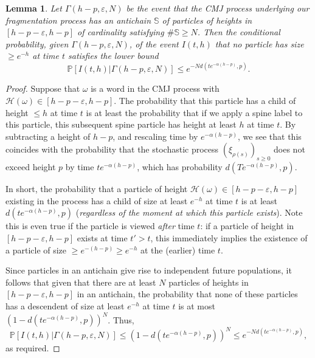 \documentclass[a4,12pt]{amsart}
\numberwithin{equation}{section}
\newtheorem{lemma}[thm]{Lemma}
\begin{document}
    \begin{lemma} \label{lem:previous}
    Let $\Gamma(h-p,\varepsilon,N)$ be the event that the CMJ process underlying our fragmentation process has an antichain $\mathbb{S}$ of particles of heights in $[h-p-\varepsilon,h-p]$ of cardinality satisfying $\# \mathbb{S} \geq N$.     Then the conditional probability, given $\Gamma(h-p,\varepsilon,N)$, of the event $I(t,h)$ that no particle has size $\geq e^{-h}$ at time $t$ satisfies the lower bound
\begin{equation}
\mathbb{P}[ I(t,h) | \Gamma(h-p,\varepsilon,N) ] \leq e^{ - N d(te^{-\alpha(h-p)},p)  }.
\end{equation}
    \end{lemma}

\begin{proof}
Suppose that $\omega$ is a word in the CMJ process with $\mathcal{H}(\omega) \in [h-p-\varepsilon,h-p]$. The probability that this particle has a child of height $\leq h$ at time $t$ is at least the probability that if we apply a spine label to this particle, this subsequent spine particle has height at least $h$ at time $t$. By subtracting a height of $h-p$, and rescaling time by $e^{ - \alpha(h-p)}$, we see that this coincides with the probability that the stochastic process $(\xi_{\rho(s)})_{s \geq 0}$ does not exceed height $p$ by time $te^{ - \alpha(h-p)}$, which has probability $d(Te^{ - \alpha(h-p)}, p)$. 

In short, the probability that a particle of height $\mathcal{H}(\omega) \in [h-p-\varepsilon,h-p]$ existing 
in the process has a child of size at least $e^{-h}$ at time $t$ is at least $d(t e^{ - \alpha(h-p)}, p)$ (\emph{regardless of the moment at which this particle exists}). Note this is even true if the particle is viewed \emph{after} time $t$: if a particle of height in $[h-p-\varepsilon,h-p]$ exists at time $t ' > t$, this immediately implies the existence of a particle of size $\geq e^{ - (h-p)} \geq e^{-h}$ at the (earlier) time $t$. 

Since particles in an antichain give rise to independent future populations, it follows that given that there are at least $N$ particles of heights in $[h-p-\varepsilon,h-p]$ in an antichain, the probability that none of these particles has a descendent of size at least $e^{-h}$ at time $t$ is at most $(1-d(te^{-\alpha(h-p)},p))^N$. Thus,
\begin{equation}
\mathbb{P}[ I(t,h) | \Gamma(h-p,\varepsilon,N) ] \leq (1-d(te^{ - \alpha(h-p)}, p ))^N \leq e^{ - N d(te^{-\alpha(h-p)},p)  },
\end{equation}
 as required.
\end{proof}
\end{document}
